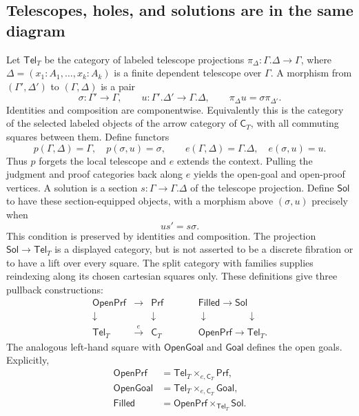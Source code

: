 \documentclass[11pt]{article}
\newcommand{\Cat}[1]{\mathsf{#1}}
\begin{document}
\subsection{Telescopes, holes, and solutions are in the same diagram}

Let $\Cat{Tel}_T$ be the category of labeled telescope projections
$\pi_\Delta:\Gamma.\Delta\to\Gamma$, where
$\Delta=(x_1:A_1,\ldots,x_k:A_k)$ is a finite dependent telescope over
$\Gamma$. A morphism from $(\Gamma',\Delta')$ to $(\Gamma,\Delta)$
is a pair
\[
 \sigma:\Gamma'\to\Gamma,\qquad
 u:\Gamma'.\Delta'\to\Gamma.\Delta,
 \qquad \pi_\Delta u=\sigma\pi_{\Delta'}.
\]
Identities and composition are componentwise. Equivalently this is the
category of the selected labeled objects of the arrow category of
$\Cat C_T$, with all commuting squares between them. Define functors
\[
 p(\Gamma,\Delta)=\Gamma,\quad p(\sigma,u)=\sigma,\qquad
 e(\Gamma,\Delta)=\Gamma.\Delta,\quad e(\sigma,u)=u.
\]
Thus $p$ forgets the local telescope and $e$ extends the context.
Pulling the judgment and proof categories back along $e$ yields the
open-goal and open-proof vertices. A solution is a section
$s:\Gamma\to\Gamma.\Delta$ of the telescope projection.
Define $\Cat{Sol}$ to have these section-equipped objects, with a
morphism above $(\sigma,u)$ precisely when
\[u s'=s\sigma.\]
This condition is preserved by identities and composition. The projection
$\Cat{Sol}\to\Cat{Tel}_T$ is a displayed category, but is not
asserted to be a discrete fibration or to have a lift over every square.
The split category with families supplies reindexing along its chosen
cartesian squares only. These definitions give
three pullback constructions:
\[
\begin{array}{ccccc}
 \Cat{OpenPrf}&\longrightarrow&\Cat{Prf}
 &\qquad&\Cat{Filled}\longrightarrow\Cat{Sol}\\
 \downarrow&&\downarrow&&\downarrow\qquad\qquad\downarrow\\
 \Cat{Tel}_T&\xrightarrow{\ e\ }&\Cat C_T
 &&\Cat{OpenPrf}\longrightarrow\Cat{Tel}_T .
\end{array}                                                     \tag{D3}
\]
The analogous left-hand square with $\Cat{OpenGoal}$ and $\Cat{Goal}$
defines the open goals. Explicitly,
\begin{align*}
\Cat{OpenPrf}&=\Cat{Tel}_T\times_{e,\Cat C_T}\Cat{Prf},\\
\Cat{OpenGoal}&=\Cat{Tel}_T\times_{e,\Cat C_T}\Cat{Goal},\\
\Cat{Filled}&=\Cat{OpenPrf}\times_{\Cat{Tel}_T}\Cat{Sol}.
\end{align*}
\end{document}
